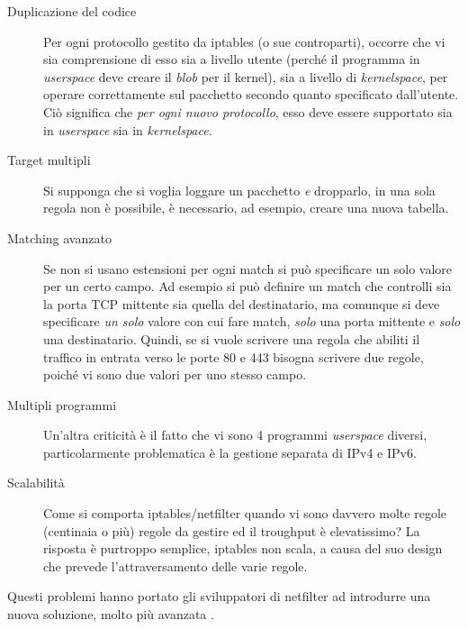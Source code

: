 \begin{description}
  \item[Duplicazione del codice]Per ogni protocollo gestito da iptables (o sue
  controparti), occorre che vi sia comprensione di esso sia a livello
  utente (perché il programma in \textit{userspace} deve creare il \textit{blob} per
  il kernel), sia a livello di \textit{kernelspace}, per operare correttamente sul pacchetto
  secondo quanto specificato dall'utente.\\
  Ciò significa che \textit{per ogni nuovo protocollo}, esso deve essere
  supportato sia in \textit{userspace} sia in \textit{kernelspace}.
  \item[Target multipli]Si supponga che si voglia loggare un pacchetto
  \textit{e} dropparlo, in una sola regola non è possibile, è necessario, ad
  esempio, creare una nuova tabella.
  \item[Matching avanzato]Se non si usano estensioni per ogni match si può specificare
  un solo valore per un certo campo. Ad esempio si può definire un match che controlli
  sia la porta TCP mittente sia quella del destinatario, ma comunque si
  deve specificare \textit{un solo} valore con cui fare match, \textit{solo} una porta mittente
  e \textit{solo} una destinatario.
  Quindi, se si vuole scrivere una regola che abiliti il traffico in entrata verso
  le porte 80 e 443 bisogna scrivere due regole, poiché vi sono due valori per uno stesso campo.
  \item[Multipli programmi]Un'altra criticità è il fatto che vi sono 4 programmi
  \textit{userspace} diversi, particolarmente problematica è la gestione separata di IPv4
  e IPv6.
  \item[Scalabilità]Come si comporta iptables/netfilter quando vi sono
  davvero molte regole (centinaia o più) regole da gestire ed il troughput
  è elevatissimo? La risposta è purtroppo semplice, iptables non scala, a causa
  del suo design che prevede l'attraversamento delle varie regole.
\end{description}

Questi problemi hanno portato gli sviluppatori di netfilter ad introdurre
una nuova soluzione, molto più avanzata \cite{nftables-pro}.
